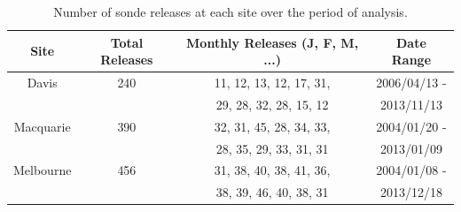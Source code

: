 \documentclass[acp, manuscript]{copernicus} %
\providecommand{\DIFadd}[1]{{\protect\color{blue}\uwave{#1}}} %
\providecommand{\DIFaddFL}[1]{\DIFadd{#1}} %
\providecommand{\DIFaddbeginFL}{} %
\providecommand{\DIFaddendFL}{} %
\begin{document}
    \begin{table}[t]
      \caption{Number of sonde releases at each site over the period of analysis.}
      \begin{tabular}{ c   c   c   c  } 
	\hline
	Site 		 & Total Releases & Monthly Releases (J, F, M, ...) & Date Range \\
	\hline
	Davis		 & 240	& 11, 12, 13, 12, 17, 31,	& 2006/04/13 -  \\ 
			 &	& 29, 28, 32, 28, 15, 12 	& 2013/11/13	\\
	Macquarie \DIFaddbeginFL \DIFaddFL{Island }\DIFaddendFL & 390	& 32, 31, 45, 28, 34, 33,	& 2004/01/20 -  \\
			 &	& 28, 35, 29, 33, 31, 31 	& 2013/01/09	\\ 
	Melbourne 	 & 456	& 31, 38, 40, 38, 41, 36,	& 2004/01/08 -  \\
			 &	& 38, 39, 46, 40, 38, 31 	& 2013/12/18	\\
	\hline
      \end{tabular}
      \label{table:sondesummary}
    \end{table}
\end{document}
